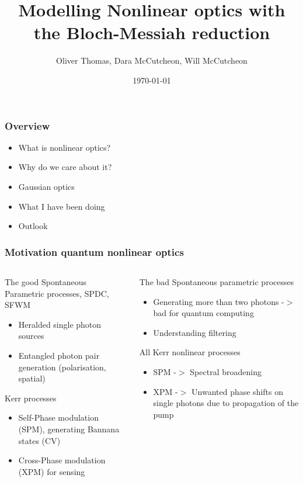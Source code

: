 \documentclass{beamer}
\title{Modelling Nonlinear optics with the Bloch-Messiah reduction}
\author{Oliver Thomas, Dara McCutcheon, Will McCutcheon}
\institute{Quantum Engineering CDT \\ University of Bristol}
\date{\today}
\begin{document}
\frame{\titlepage}

\begin{frame}
\frametitle{Overview}
\begin{itemize}
    \item What is nonlinear optics?
    \item Why do we care about it?
    \item Gaussian optics
    \item What I have been doing
    \item Outlook
\end{itemize}
\end{frame}

\begin{frame}
\frametitle{Motivation quantum nonlinear optics}
\begin{columns}
    \begin{block}{The good}
    Spontaneous Parametric processes, SPDC, SFWM
    \begin{itemize}
        \item Heralded single photon sources
        \item Entangled photon pair generation (polarisation, spatial)
    \end{itemize}
    Kerr processes 
    \begin{itemize}
        \item Self-Phase modulation (SPM), generating Bannana states (CV)
        \item Cross-Phase modulation (XPM) for sensing
    \end{itemize}
    \end{block}
%
    \begin{block}{The bad}
        Spontaneous parametric processes
        \begin{itemize}
            \item Generating more than two photons -$>$ bad for quantum computing
            \item Understanding filtering
        \end{itemize}
        All Kerr nonlinear processes 
        \begin{itemize}
            \item SPM -$>$ Spectral broadening
            \item XPM -$>$ Unwanted phase shifts on single photons due to propagation of the pump 
        \end{itemize}
        \end{block}
\end{columns}

\end{frame}
\end{document}
